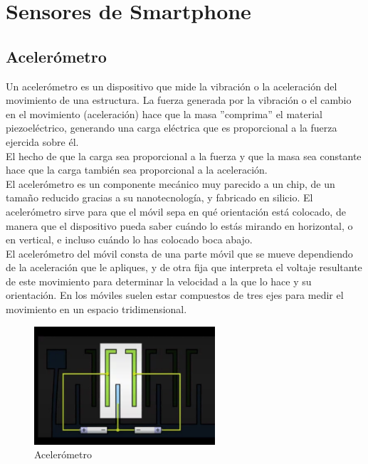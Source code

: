 \section{Sensores de Smartphone}

\subsection{Acelerómetro}

Un acelerómetro es un dispositivo que mide la vibración o la aceleración del movimiento de una estructura. La fuerza generada por la vibración o el cambio en el movimiento (aceleración) hace que la masa ''comprima'' el material piezoeléctrico, generando una carga eléctrica que es proporcional a la fuerza ejercida sobre él.\\

El hecho de que la carga sea proporcional a la fuerza y que la masa sea constante hace que la carga también sea proporcional a la aceleración.\\

El acelerómetro es un componente mecánico muy parecido a un chip, de un tamaño reducido gracias a su nanotecnología, y fabricado en silicio. El acelerómetro sirve para que el móvil sepa en qué orientación está colocado, de manera que el dispositivo pueda saber cuándo lo estás mirando en horizontal, o en vertical, e incluso cuándo lo has colocado boca abajo.\\

El acelerómetro del móvil consta de una parte móvil que se mueve dependiendo de la aceleración que le apliques, y de otra fija que interpreta el voltaje resultante de este movimiento para determinar la velocidad a la que lo hace y su orientación. En los móviles suelen estar compuestos de tres ejes para medir el movimiento en un espacio tridimensional.

\begin{figure}[htbp!]
	\begin{center}
		\includegraphics[width=0.6\textwidth]{MarcoTeorico/imagenes/Acelerometro}
		\caption{Acelerómetro}
		\label{MT/SS/Acelerometro}
	\end{center}
\end{figure}

